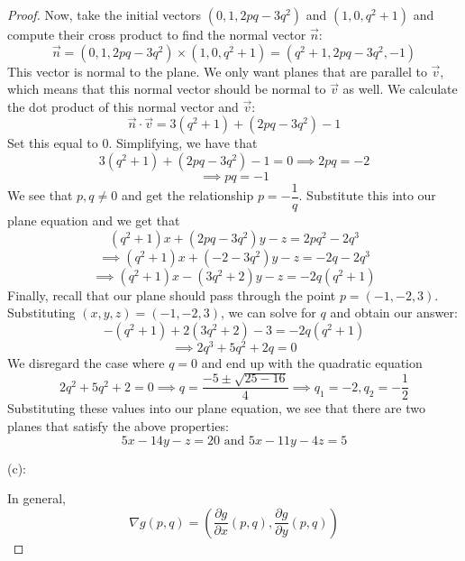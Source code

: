 \documentclass{article}
\theoremstyle{plain} %
\numberwithin{thm}{section} %
\theoremstyle{definition}
\begin{document}
\begin{proof}
            Now, take the initial vectors \((0, 1, 2pq - 3q^2)\) and \((1,0,q^2 + 1)\) and compute their cross product to find the normal vector \(\vec{n}\):
            \[
                \vec{n} = (0,1,2pq-3q^2) \times (1,0,q^2+1) = (q^2 + 1, 2pq - 3q^2, -1)
            \]
            This vector is normal to the plane. We only want planes that are parallel to \(\vec{v}\), which means that this normal vector should be normal to \(\vec{v}\) as well. We calculate the dot product of this normal vector and \(\vec{v}\):
            \[
                \vec{n} \cdot \vec{v} = 3(q^2 + 1) + (2pq - 3q^2) - 1
            \]
            Set this equal to 0. Simplifying, we have that
            \[
                3(q^2 + 1) + (2pq - 3q^2) - 1 = 0 \implies 2pq = -2
            \]
            \[
                \implies pq = -1
            \]
            We see that \(p,q \neq 0\) and get the relationship \(p = -\dfrac{1}{q}\). Substitute this into our plane equation and we get that
            \[
                (q^2 + 1)x + (2pq - 3q^2)y - z = 2pq^2 - 2q^3
            \]
            \[
                \implies (q^2 + 1)x + (-2 - 3q^2)y - z = -2q - 2q^3
            \]
            \[
                \implies (q^2 + 1)x - (3q^2 + 2)y - z = -2q(q^2 + 1)
            \]
            Finally, recall that our plane should pass through the point \(p = (-1,-2,3)\). Substituting \((x,y,z) = (-1,-2,3)\), we can solve for \(q\) and obtain our answer:
            \[
                -(q^2 + 1) + 2(3q^2 + 2) - 3 = -2q(q^2 + 1)
            \]
            \[
                \implies 2q^3 + 5q^2 + 2q = 0
            \]
            We disregard the case where \(q=0\) and end up with the quadratic equation
            \[
                2q^2 + 5q^2 + 2 = 0 \implies q = \frac{-5 \pm \sqrt{25 - 16}}{4} \implies q_1 = -2, q_2 = -\frac{1}{2}
            \]
            Substituting these values into our plane equation, we see that there are two planes that satisfy the above properties:
            \[
                5x - 14y - z = 20 \text{ and } 5x - 11y - 4z = 5
            \]

            (c):

            In general,
            \[
                \nabla g(p,q) = \left( \frac{\partial g}{\partial x} (p,q) , \frac{\partial g}{\partial y} (p,q) \right) 
            \]
            

\end{proof}
\end{document}
